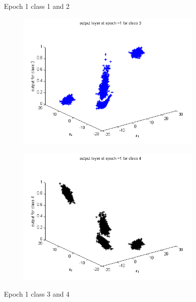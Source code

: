 \documentclass{article}
\begin{document}
\begin{flushleft}
\begin{figure}
\begin{subfigure}{.5\textwidth}
\end{subfigure}
\caption{Epoch 1 class 1 and 2}
\end{figure}

\begin{figure}
\begin{subfigure}{.5\textwidth}
  \centering
  \includegraphics[width=.8\linewidth]{Classification/linearlySeparable/1_3}
 
\end{subfigure}%
\begin{subfigure}{.5\textwidth}
  \centering
  \includegraphics[width=.8\linewidth]{Classification/linearlySeparable/1_4}
  
\end{subfigure}
\caption{Epoch 1 class 3 and 4}
\end{figure}


\end{flushleft}
\end{document}
